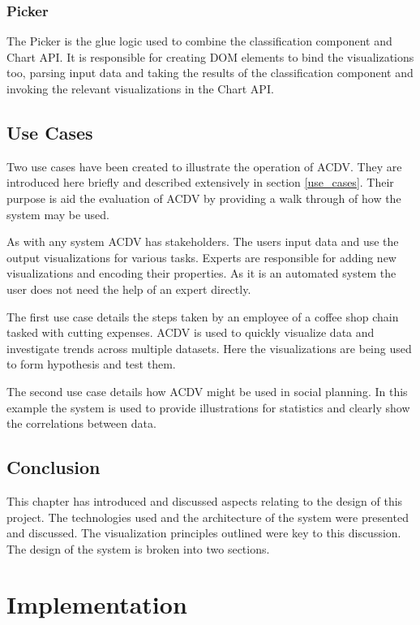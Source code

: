 \documentclass[a4paper, 11pt, titlepage, onehalfspacing]{report}
\begin{document}
\subsection{Picker}
The Picker is the glue logic used to combine the classification component and Chart API. It is responsible for creating DOM elements to bind the visualizations too, parsing input data and taking the results of the classification component and invoking the relevant visualizations in the Chart API.

\section{Use Cases}
Two use cases have been created to illustrate the operation of AC\lightning{}DV. They are introduced here briefly and described extensively in section \ref{use_cases}. Their purpose is aid the evaluation of AC\lightning{}DV by providing a walk through of how the system may be used.

As with any system AC\lightning{}DV has stakeholders. The users input data and use the output visualizations for various tasks. Experts are responsible for adding new visualizations and encoding their properties. As it is an automated system the user does not need the help of an expert directly.

The first use case details the steps taken by an employee of a coffee shop chain tasked with cutting expenses. AC\lightning{}DV is used to quickly visualize data and investigate trends across multiple datasets. Here the visualizations are being used to form hypothesis and test them.

The second use case details how AC\lightning{}DV might be used in social planning. In this example the system is used to provide illustrations for statistics and clearly show the correlations between data.  

\section{Conclusion}
This chapter has introduced and discussed aspects relating to the design of this project. The technologies used and the architecture of the system were presented and discussed. The visualization principles outlined were key to this discussion. The design of the system is broken into two sections.



\chapter{Implementation}
\end{document}
